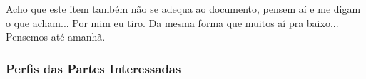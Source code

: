 	Acho que este item também não se adequa ao documento, pensem aí e me digam o que acham... Por mim eu tiro. Da mesma forma que muitos aí pra baixo... Pensemos até amanhã.

\subsubsection{Perfis das Partes Interessadas}


